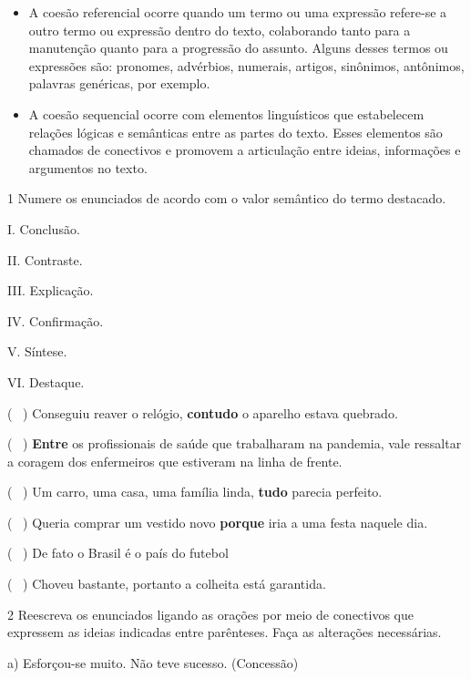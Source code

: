 \begin{itemize}
\item
  A coesão referencial ocorre quando um termo ou uma expressão refere-se
  a outro termo ou expressão dentro do texto, colaborando tanto para a
  manutenção quanto para a progressão do assunto. Alguns desses termos
  ou expressões são: pronomes, advérbios, numerais, artigos, sinônimos,
  antônimos, palavras genéricas, por exemplo.
\item
  A coesão sequencial ocorre com elementos linguísticos que estabelecem
  relações lógicas e semânticas entre as partes do texto. Esses
  elementos são chamados de conectivos e promovem a articulação entre
  ideias, informações e argumentos no texto.
\end{itemize}


\num{1} Numere os enunciados de acordo com o valor semântico do termo
destacado.

\begin{multicols}{2}
I. Conclusão.

II. Contraste. 

III. Explicação.

IV. Confirmação. 

V. Síntese. 

VI. Destaque.

\columnbreak

(~ ) Conseguiu reaver o relógio, \textbf{contudo} o aparelho
estava quebrado. 

(~ ) \textbf{Entre} os profissionais de
saúde que trabalharam na pandemia, vale ressaltar a coragem dos
enfermeiros que estiveram na linha de frente. 

(~ ) Um carro, uma casa, uma família linda, \textbf{tudo} parecia perfeito. 

(~ ) Queria comprar um vestido novo \textbf{porque} iria a uma
festa naquele dia. 

(~ ) De fato o Brasil é o país do futebol

(~ ) Choveu bastante, portanto a colheita está garantida.
\end{multicols}

\num{2} Reescreva os enunciados ligando as orações por meio de
conectivos que expressem as ideias indicadas entre parênteses. Faça as
alterações necessárias.

a) Esforçou-se muito. Não teve sucesso. (Concessão)

